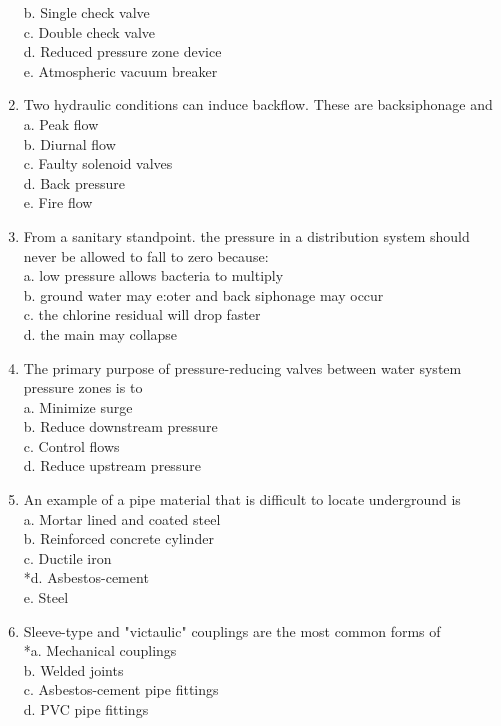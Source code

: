 \begin{enumerate}[1.]
b. Single check valve\\
c. Double check valve\\
d. Reduced pressure zone device\\
e. Atmospheric vacuum breaker\\
\item Two hydraulic conditions can induce backflow. These are backsiphonage and\\
a. Peak flow\\
b. Diurnal flow\\
c. Faulty solenoid valves\\
d. Back pressure\\
e. Fire flow\\
\item From a sanitary standpoint. the pressure in a distribution system should never be allowed to fall to zero because:\\
a. low pressure allows bacteria to multiply\\
b. ground water may e:oter and back siphonage may occur\\
c. the chlorine residual will drop faster\\
d. the main may collapse\\
\item The primary purpose of pressure-reducing valves between water system pressure zones is to\\
a. Minimize surge\\
b. Reduce downstream pressure\\
c. Control flows\\
d. Reduce upstream pressure\\
\item An example of a pipe material that is difficult to locate underground is\\
a. Mortar lined and coated steel\\
b. Reinforced concrete cylinder\\
c. Ductile iron\\
*d. Asbestos-cement\\
e. Steel\\
\item Sleeve-type and "victaulic" couplings are the most common forms of\\
*a. Mechanical couplings\\
b. Welded joints\\
c. Asbestos-cement pipe fittings\\
d. PVC pipe fittings\\

\end{enumerate}

